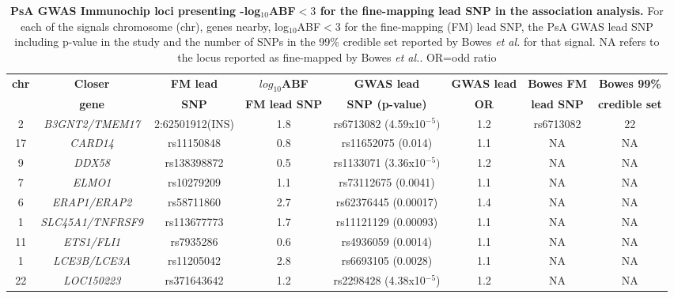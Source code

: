 \begin{landscape}
\begin{center}
\begin{longtable}[ht]{c c c c c c c c}
\caption[PsA GWAS Immunochip loci presenting log${_10}$ABF$<3$ for the fine-mapping lead SNP in the association analysis.]{\textbf{PsA GWAS Immunochip loci presenting -log${_10}$ABF$<3$ for the fine-mapping lead SNP in the association analysis.} For each of the signals chromosome (chr), genes nearby, log${_10}$ABF$<3$ for the fine-mapping (FM) lead SNP, the PsA GWAS lead SNP including p-value in the study and the number of SNPs in the 99\% credible set reported by Bowes \textit{et al.} for that signal. NA refers to the locus reported as fine-mapped by Bowes \textit{et al.}. OR=odd ratio}
\label{tab:PsA_loci_no_fine_mapping}\\
\toprule
\textbf{chr} & \textbf{Closer} & \textbf{FM lead} &\textbf{$log_{10}$ABF} & \textbf{GWAS lead}  &  \textbf{GWAS lead}   &\textbf{Bowes FM} & \textbf{Bowes 99\%} \\
             & \textbf{gene} & \textbf{SNP}    &\textbf{FM lead SNP}   & \textbf{SNP (p-value)} &  \textbf{OR}          &\textbf{lead SNP} & \textbf{credible set} \\
\midrule
\midrule
2	 & \textit{B3GNT2/TMEM17} & 2:62501912(INS)  &1.8   & rs6713082 (4.59x10$^{-5})$ & 1.2 &rs6713082	& 22 \\
17 & \textit{CARD14}	      & rs11150848 &0.8  & rs11652075 (0.014)       &  1.1  &NA	& NA \\
9	 & \textit{DDX58}	        &rs138398872&	0.5   & rs1133071 (3.36x10$^{-5})$ & 1.2 &	NA	&NA \\
7	 & \textit{ELMO1}	        &rs10279209&	1.1   & rs73112675 (0.0041)        &	1.1 &NA	& NA \\
6	 & \textit{ERAP1/ERAP2}	  &rs58711860&	2.7 	& rs62376445 (0.00017) & 1.4 &	NA	&NA \\
1	 & \textit{SLC45A1/TNFRSF9} &rs113677773	&	1.7 &	rs11121129 (0.00093) & 1.1 & NA	& NA \\
11 & \textit{ETS1/FLI1}	    &rs7935286&	0.6   & rs4936059 (0.0014)	& 1.1  & NA  &	NA \\ 
1	 & \textit{LCE3B/LCE3A}	  &rs11205042&	2.8 	& rs6693105 (0.0028)	& 1.1 & NA	& NA \\
22 & \textit{LOC150223}	    &rs371643642&	1.2   & rs2298428 (4.38x10$^{-5}$) & 1.2	& NA	& NA \\

\end{longtable}
\end{center}
\end{landscape}
